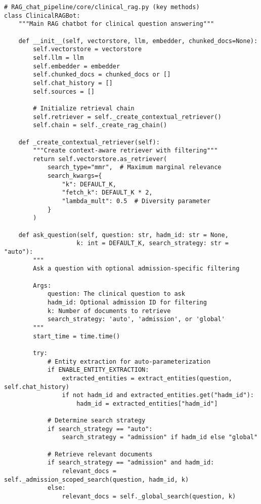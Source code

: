 \begin{verbatim}
# RAG_chat_pipeline/core/clinical_rag.py (key methods)
class ClinicalRAGBot:
    """Main RAG chatbot for clinical question answering"""
    
    def __init__(self, vectorstore, llm, embedder, chunked_docs=None):
        self.vectorstore = vectorstore
        self.llm = llm
        self.embedder = embedder
        self.chunked_docs = chunked_docs or []
        self.chat_history = []
        self.sources = []
        
        # Initialize retrieval chain
        self.retriever = self._create_contextual_retriever()
        self.chain = self._create_rag_chain()
    
    def _create_contextual_retriever(self):
        """Create context-aware retriever with filtering"""
        return self.vectorstore.as_retriever(
            search_type="mmr",  # Maximum marginal relevance
            search_kwargs={
                "k": DEFAULT_K,
                "fetch_k": DEFAULT_K * 2,
                "lambda_mult": 0.5  # Diversity parameter
            }
        )
    
    def ask_question(self, question: str, hadm_id: str = None, 
                    k: int = DEFAULT_K, search_strategy: str = "auto"):
        """
        Ask a question with optional admission-specific filtering
        
        Args:
            question: The clinical question to ask
            hadm_id: Optional admission ID for filtering
            k: Number of documents to retrieve
            search_strategy: 'auto', 'admission', or 'global'
        """
        start_time = time.time()
        
        try:
            # Entity extraction for auto-parameterization
            if ENABLE_ENTITY_EXTRACTION:
                extracted_entities = extract_entities(question, self.chat_history)
                if not hadm_id and extracted_entities.get("hadm_id"):
                    hadm_id = extracted_entities["hadm_id"]
            
            # Determine search strategy
            if search_strategy == "auto":
                search_strategy = "admission" if hadm_id else "global"
            
            # Retrieve relevant documents
            if search_strategy == "admission" and hadm_id:
                relevant_docs = self._admission_scoped_search(question, hadm_id, k)
            else:
                relevant_docs = self._global_search(question, k)
            

\end{verbatim}
